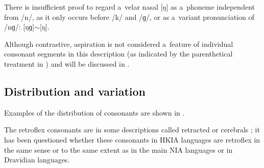 There is insufficient proof to regard a~velar nasal [ŋ] as a~phoneme independent from /n/, as it only occurs before /k/ and /ɡ/, or as a~variant pronunciation of /nɡ/: [ŋɡ]$\sim$[ŋ]. 


Although contrastive, aspiration is not considered a~feature of individual consonant segments in this description (as indicated by the parenthetical treatment in ) and will be discussed in .

\subsection{Distribution and variation}
\label{subsec:3-1-1}

Examples of the distribution of consonants are shown in . 


The retroflex consonants are in some descriptions called retracted \citep[16]{schmidtkohistani2008} or cerebrals \citep{morgenstierne1941}; it has been questioned whether these consonants in HKIA languages are retroflex in the same sense or to the same extent as in the main NIA languages or in Dravidian languages. 


